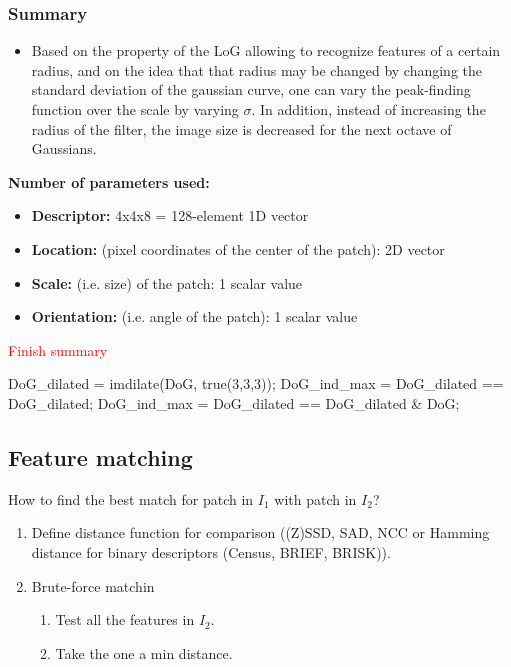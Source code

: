 \documentclass[10pt,a4paper]{scrartcl}
\begin{document}
\begin{multicols*}{2}
\subsubsection{Summary}

\begin{itemize}
\item Based on the property of the LoG allowing to recognize features of a certain radius, and on the idea that that radius may be changed by changing the standard deviation of the gaussian curve, one can vary the peak-finding function over the scale by varying $\sigma$. In addition, instead of increasing the radius of the filter, the image size is decreased for the next octave of Gaussians.
\end{itemize}

\textbf{Number of parameters used:}

\begin{itemize}
\item \textbf{Descriptor:} 4x4x8 = 128-element 1D vector
\item \textbf{Location:} (pixel coordinates of the center of the patch): 2D vector
\item \textbf{Scale:} (i.e. size) of the patch: 1 scalar value
\item \textbf{Orientation:} (i.e. angle of the patch): 1 scalar value
\end{itemize}

\textcolor{red}{Finish summary}

\begin{TPMatlab}
DoG_dilated = imdilate(DoG, true(3,3,3));
DoG_ind_max = DoG_dilated == DoG_dilated;
DoG_ind_max = DoG_dilated == DoG_dilated & DoG;
\end{TPMatlab}

\subsection{Feature matching}

How to find the best match for patch in $I_1$ with patch in $I_2$?

\begin{enumerate}
\item Define distance function for comparison ((Z)SSD, SAD, NCC or Hamming distance for binary descriptors (Census, BRIEF, BRISK)).
\item Brute-force matchin
\begin{enumerate}
\item Test all the features in $I_2$.
\item Take the one a min distance.
\end{enumerate}
\end{enumerate}


\end{multicols*}
\end{document}
